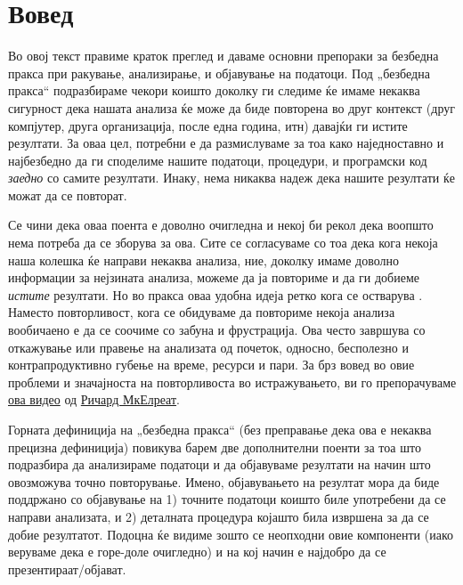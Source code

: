 \documentclass[
]{book}
\begin{document}
\hypertarget{intro}{%
\chapter{Вовед}\label{intro}}

Во овој текст правиме краток преглед и даваме основни препораки за безбедна пракса при ракување, анализирање, и објавување на податоци. Под „безбедна пракса`` подразбираме чекори коишто доколку ги следиме ќе имаме некаква сигурност дека нашата анализа ќе може да биде повторена во друг контекст (друг компјутер, друга организација, после една година, итн) давајќи ги истите резултати. За оваа цел, потребни е да размислуваме за тоа како наједноставно и најбезбедно да ги споделиме нашите податоци, процедури, и програмски код \emph{заедно} со самите резултати. Инаку, нема никаква надеж дека нашите резултати ќе можат да се повторат.

Се чини дека оваа поента е доволно очигледна и некој би рекол дека воопшто нема потреба да се зборува за ова. Сите се согласуваме со тоа дека кога некоја наша колешка ќе направи некаква анализа, ние, доколку имаме доволно информации за нејзината анализа, можеме да ја повториме и да ги добиеме \emph{истите} резултати. Но во пракса оваа удобна идеја ретко кога се остварува \citep{minocher2020}. Наместо повторливост, кога се обидуваме да повториме некоја анализа вообичаено е да се соочиме со забуна и фрустрација. Ова често завршува со откажување или правење на анализата од почеток, односно, бесполезно и контрапродуктивно губење на време, ресурси и пари. За брз вовед во овие проблеми и значајноста на повторливоста во истражувањето, ви го препорачуваме \href{https://www.youtube.com/watch?v=zwRdO9_GGhY\&t=14s}{ова видео} од \href{https://xcelab.net/rm/}{Ричард МкЕлреат}.

Горната дефиниција на „безбедна пракса`` (без преправање дека ова е некаква прецизна дефиниција) повикува барем две дополнителни поенти за тоа што подразбира да анализираме податоци и да објавуваме резултати на начин што овозможува точно повторување. Имено, објавувањето на резултат мора да биде поддржано со објавување на 1) точните податоци коишто биле употребени да се направи анализата, и 2) деталната процедура којашто била извршена за да се добие резултатот. Подоцна ќе видиме зошто се неопходни овие компоненти (иако веруваме дека е горе-доле очигледно) и на кој начин е најдобро да се презентираат/објават.
\end{document}

